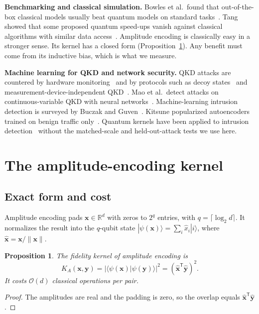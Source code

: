 \documentclass[pdflatex,sn-mathphys-num,lineno]{sn-jnl}
\theoremstyle{thmstyleone}
\newtheorem{proposition}{Proposition}
\begin{document}
\textbf{Benchmarking and classical simulation.} Bowles et al.\ found that
out-of-the-box classical models usually beat quantum models on standard
tasks~\cite{bowles2024better}. Tang showed that some proposed quantum speed-ups
vanish against classical algorithms with similar data
access~\cite{tang2019quantum}. Amplitude encoding is classically easy in a
stronger sense. Its kernel has a closed form (Proposition~\ref{prop:exact}). Any
benefit must come from its inductive bias, which is what we measure.

\textbf{Machine learning for QKD and network security.} QKD attacks are countered
by hardware monitoring~\cite{dasilva2012monitoring} and by protocols such as decoy
states~\cite{lo2005decoy} and measurement-device-independent
QKD~\cite{lo2012measurement}. Mao et al.\ detect attacks on continuous-variable QKD
with neural networks~\cite{mao2020detecting}. Machine-learning intrusion detection
is surveyed by Buczak and Guven~\cite{buczak2016survey}. Kitsune popularized
autoencoders trained on benign traffic only~\cite{mirsky2018kitsune}. Quantum
kernels have been applied to intrusion
detection~\cite{kalinin2023security,suryotrisongko2022evaluating} without the
matched-scale and held-out-attack tests we use here.

\section{The amplitude-encoding kernel}
\label{sec:theory}

\subsection{Exact form and cost}

Amplitude encoding pads $\mathbf{x}\in\mathbb{R}^d$ with zeros to $2^q$ entries,
with $q=\lceil\log_2 d\rceil$. It normalizes the result into the $q$-qubit state
$|\psi(\mathbf{x})\rangle=\sum_i \hat{x}_i|i\rangle$, where
$\hat{\mathbf{x}}=\mathbf{x}/\|\mathbf{x}\|$.

\begin{proposition}\label{prop:exact}
The fidelity kernel of amplitude encoding is
\begin{equation}
K_A(\mathbf{x},\mathbf{y}) = |\langle\psi(\mathbf{x})|\psi(\mathbf{y})\rangle|^2
= (\hat{\mathbf{x}}^{\mathsf{T}}\hat{\mathbf{y}})^2 .
\label{eq:ka}
\end{equation}
It costs $\mathcal{O}(d)$ classical operations per pair.
\end{proposition}
\begin{proof}
The amplitudes are real and the padding is zero, so the overlap equals
$\hat{\mathbf{x}}^{\mathsf{T}}\hat{\mathbf{y}}$.
\end{proof}
\end{document}
